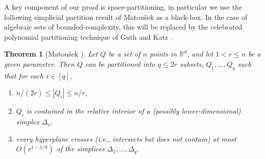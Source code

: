 \documentclass[11pt]{article}
\theoremstyle{plain}
\newtheorem{theorem}{Theorem}[section]
\theoremstyle{definition}
\begin{document}
	A key component of our proof is space-partitioning, in particular we use the following simplicial partition result of Matou\v{s}ek \cite{Mat} as a black-box. In the case of algebraic sets of bounded-complexity, this will be replaced by the celebrated polynomial partitioning technique of Guth and Katz \cite{GK}.
	
	\begin{theorem}[Matou\v{s}ek \cite{Mat}]\label{thm:matousek}
		Let $Q$ be a set of $n$ points in $\mathbb{R}^d$,  and let $1 < r \leq n$ be a given parameter. Then $Q$ can be partitioned into $q \leq 2r$ subsets, $Q_1,...,Q_q$ such that for each $i\in [q]$,
		\begin{enumerate}
			\item  $n/(2r) \leq |Q_i|\leq n/r$,
			\item $Q_i$ is contained in the relative interior of a (possibly lower-dimensional) simplex $\Delta_i$,
			\item every hyperplane crosses (i.e., intersects but does not contain) at most $O(r^{1-1/d})$ of the simplices $\Delta_1,\dots,\Delta_q$.
		\end{enumerate} 
	\end{theorem}
	
\end{document}
